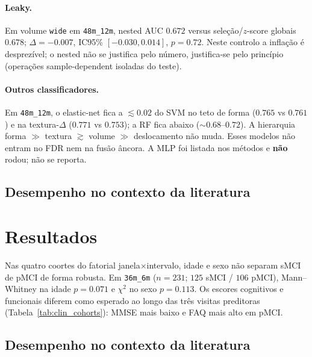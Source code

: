 \documentclass[review]{elsarticle}
\newcommand{\code}[1]{\texttt{#1}}
\begin{document}
	\paragraph{Leaky.}
	Em volume \code{wide} em \code{48m\_12m}, nested AUC $0.672$ versus seleção/$z$-score globais $0.678$; $\Delta=-0.007$, IC95\% $[-0.030,0.014]$, $p=0.72$.
	Neste controlo a inflação é desprezível; o nested não se justifica pelo número, justifica-se pelo princípio (operações sample-dependent isoladas do teste).
	
	\paragraph{Outros classificadores.}
	Em \code{48m\_12m}, o elastic-net fica a $\lesssim 0.02$ do SVM no teto de forma ($0.765$ vs $0.761$) e na textura-$\Delta$ ($0.771$ vs $0.753$); a RF fica abaixo ($\sim 0.68$--$0.72$).
	A hierarquia forma $\gg$ textura $\gtrsim$ volume $\gg$ deslocamento não muda.
	Esses modelos não entram no FDR nem na fusão âncora.
	A MLP foi listada nos métodos e \textbf{não} rodou; não se reporta.

\subsection{Desempenho no contexto da literatura}
	\section{Resultados}
\label{sec:resultados}

Nas quatro coortes do fatorial janela$\times$intervalo, idade e sexo não separam sMCI de pMCI de forma robusta.
Em \code{36m\_6m} ($n=231$; $125$ sMCI / $106$ pMCI), Mann--Whitney na idade $p=0.071$ e $\chi^2$ no sexo $p=0.113$.
Os escores cognitivos e funcionais diferem como esperado ao longo das três visitas preditoras (Tabela~\ref{tab:clin_cohorts}): MMSE mais baixo e FAQ mais alto em pMCI.

\subsection{Desempenho no contexto da literatura}
\end{document}

